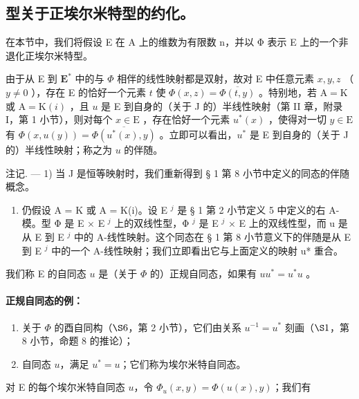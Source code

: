 \subsection{型关于正埃尔米特型的约化。}

在本节中，我们将假设 E 在 A 上的维数为有限数 n，并以 Φ 表示 E 上的一个非退化正埃尔米特型。

由于从 E 到 \(\mathbf{E}^*\) 中的与 \(\Phi\) 相伴的线性映射都是双射，故对 E 中任意元素 \(x, y, z\) （ \(y \neq 0\) ），存在 E 的恰好一个元素 \(t\) 使 \(\Phi(x, z) = \overline{\Phi(t, y)}\) 。特别地，若 \(\mathrm{A} = \mathrm{K}\) 或 \(\mathrm{A} = \mathrm{K}(i)\) ，且 \(u\) 是 E 到自身的（关于 J 的）半线性映射（第 II 章，附录 I，第 1 小节），则对每个 \(x \in \mathrm{E}\) ，存在恰好一个元素 \(u^*(x)\) ，使得对一切 \(y \in \mathrm{E}\) 有 \(\Phi(x, u(y)) = \overline{\Phi(u^*(x), y)}\) 。立即可以看出，\(u^*\) 是 E 到自身的（关于 J 的）半线性映射；称之为 \(u\) 的伴随。

注记. --- 1) 当 J 是恒等映射时，我们重新得到 § 1 第 8 小节中定义的同态的伴随概念。

\begin{enumerate}
\def\labelenumi{\arabic{enumi})}
\setcounter{enumi}{1}
\tightlist
\item
  仍假设 A = K 或 A = K(i)。设 E \(^{j}\) 是 § 1 第 2 小节定义 5 中定义的右 A-模。型 Φ 是 E × E \(^{j}\) 上的双线性型，Φ \(^{j}\) 是 E \(^{j}\) × E 上的双线性型，而 u 是从 E 到 E \(^{j}\) 中的 A-线性映射。这个同态在 § 1 第 8 小节意义下的伴随是从 E 到 E \(^{j}\) 中的一个 A-线性映射；我们立即看出它与上面定义的映射 u* 重合。
\end{enumerate}

我们称 E 的自同态 \(u\) 是（关于 \(\Phi\) 的）正规自同态，如果有 \(uu^{*}=u^{*}u\) 。
\relax{}
\paragraph{正规自同态的例：}

\begin{enumerate}
\def\labelenumi{\arabic{enumi})}
\item
  关于 \(\Phi\) 的酉自同构（\(\S 6\)，第 2 小节），它们由关系 \(u^{-1} = u^{*}\) 刻画（\(\S 1\)，第 8 小节，命题 8 的推论）；
\item
  自同态 \(u\)，满足 \(u^{*}=u\)；它们称为埃尔米特自同态。
\end{enumerate}

对 E 的每个埃尔米特自同态 \(u\)，令 \(\Phi_{u}(x,y)=\Phi(u(x),y)\)；我们有

